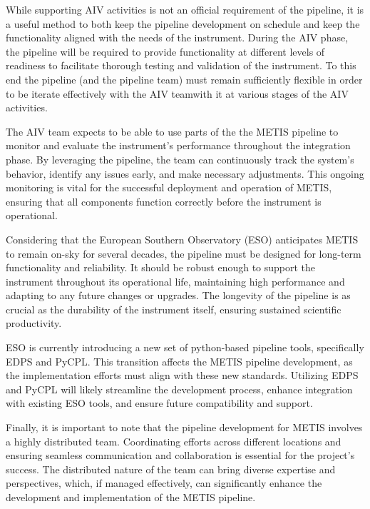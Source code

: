\documentclass[a4paper]{spie}  %
\begin{document}
While supporting AIV activities is not an official requirement of the pipeline, it is a useful method to both keep the pipeline development on schedule and keep the functionality aligned with the needs of the instrument. During the AIV phase, the pipeline will be required to provide functionality at different levels of readiness to facilitate thorough testing and validation of the instrument. To this end the pipeline (and the pipeline team) must remain sufficiently flexible in order to be iterate effectively with the AIV teamwith it at various stages of the AIV activities. 

The AIV team expects to be able to use parts of the the METIS pipeline to monitor and evaluate the instrument's performance throughout the integration phase. By leveraging the pipeline, the team can continuously track the system's behavior, identify any issues early, and make necessary adjustments. This ongoing monitoring is vital for the successful deployment and operation of METIS, ensuring that all components function correctly before the instrument is operational.

Considering that the European Southern Observatory (ESO) anticipates METIS to remain on-sky for several decades, the pipeline must be designed for long-term functionality and reliability. It should be robust enough to support the instrument throughout its operational life, maintaining high performance and adapting to any future changes or upgrades. The longevity of the pipeline is as crucial as the durability of the instrument itself, ensuring sustained scientific productivity.

ESO is currently introducing a new set of python-based pipeline tools, specifically EDPS and PyCPL. This transition affects the METIS pipeline development, as the implementation efforts must align with these new standards. Utilizing EDPS and PyCPL will likely streamline the development process, enhance integration with existing ESO tools, and ensure future compatibility and support.

Finally, it is important to note that the pipeline development for METIS involves a highly distributed team. Coordinating efforts across different locations and ensuring seamless communication and collaboration is essential for the project's success. The distributed nature of the team can bring diverse expertise and perspectives, which, if managed effectively, can significantly enhance the development and implementation of the METIS pipeline.

 
\end{document}
